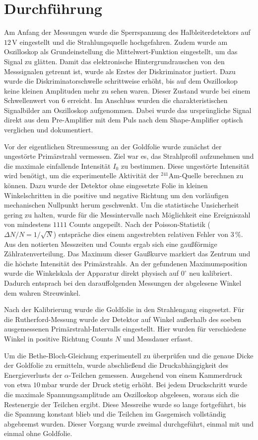 \section{Durchführung}
Am Anfang der Messungen wurde die Sperrspannung des Halbleiterdetektors auf $12\,\text{V}$ eingestellt und die Strahlungsquelle hochgefahren. Zudem wurde am Oszilloskop als Grundeinstellung die Mittelwert-Funktion eingestellt, um das Signal zu glätten.
Damit das elektronische Hintergrundrauschen von den Messsignalen getrennt ist, wurde als Erstes der Diskriminator justiert. Dazu wurde die Diskriminatorschwelle schrittweise erhöht, bis auf dem Oszilloskop keine kleinen Amplituden mehr zu sehen waren. Dieser Zustand wurde bei einem Schwellenwert von 6 erreicht.
Im Anschluss wurden die charakteristischen Signalbilder am Oszilloskop aufgenommen. Dabei wurde das ursprüngliche Signal direkt aus dem Pre-Amplifier mit dem Puls nach dem Shape-Amplifier optisch verglichen und dokumentiert.

Vor der eigentlichen Streumessung an der Goldfolie wurde zunächst der ungestörte Primärstrahl vermessen. Ziel war es, das Strahlprofil aufzunehmen und die maximale einfallende Intensität $I_0$ zu bestimmen. Diese ungestörte Intensität wird benötigt, um die experimentelle Aktivität der $^{241}\text{Am}$-Quelle berechnen zu können.
Dazu wurde der Detektor ohne eingesetzte Folie in kleinen Winkelschritten in die positive und negative Richtung um den vorläufigen mechanischen Nullpunkt herum geschwenkt. Um die statistische Unsicherheit gering zu halten, wurde für die Messintervalle nach Möglichkeit eine Ereigniszahl von mindestens $1111$ Counts angepeilt. Nach der Poisson-Statistik ($\Delta N / N = 1/\sqrt{N}$) entspräche dies einem angestrebten relativen Fehler von $3\,\%$. 
Aus den notierten Messzeiten und Counts ergab sich eine gaußförmige Zählratenverteilung. Das Maximum dieser Gaußkurve markiert das Zentrum und die höchste Intensität des Primärstrahls. An der gefundenen Maximumsposition wurde die Winkelskala der Apparatur direkt physisch auf $0^\circ$ neu kalibriert. Dadurch entsprach bei den darauffolgenden Messungen der abgelesene Winkel dem wahren Streuwinkel.

Nach der Kalibrierung wurde die Goldfolie in den Strahlengang eingesetzt. Für die Rutherford-Messung wurde der Detektor auf Winkel außerhalb des soeben ausgemessenen Primärstrahl-Intervalls eingestellt. Hier wurden für verschiedene Winkel in positive Richtung Counts $N$ und Messdauer erfasst.

Um die Bethe-Bloch-Gleichung experimentell zu überprüfen und die genaue Dicke der Goldfolie zu ermitteln, wurde abschließend die Druckabhängigkeit des Energieverlusts der $\alpha$-Teilchen gemessen. Ausgehend von einem Kammerdruck von etwa $10\,\text{mbar}$ wurde der Druck stetig erhöht. Bei jedem Druckschritt wurde die maximale Spannungsamplitude am Oszilloskop abgelesen, woraus sich die Restenergie der Teilchen ergibt. Diese Messreihe wurde so lange fortgeführt, bis die Spannung konstant blieb und die Teilchen im Gasgemisch vollständig abgebremst wurden. Dieser Vorgang wurde zweimal durchgeführt, einmal mit und einmal ohne Goldfolie.
